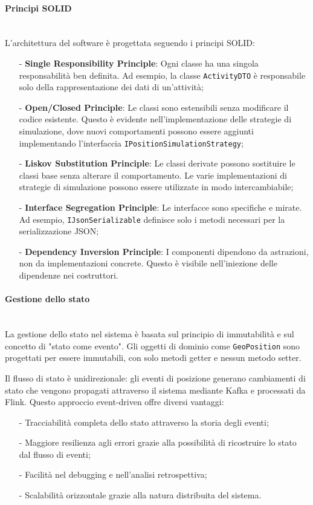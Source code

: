 \documentclass[10pt]{article}
\newcommand{\myparagraph}[1]{\paragraph{#1}\mbox{}\\}
\begin{document}
    \myparagraph{Principi SOLID}
    L'architettura del software è progettata seguendo i principi SOLID:
    \begin{itemize}
        \item[-] \textbf{Single Responsibility Principle}: Ogni classe ha una singola responsabilità ben definita. Ad esempio, la classe \texttt{ActivityDTO} è responsabile solo della rappresentazione dei dati di un'attività;
        \item[-] \textbf{Open/Closed Principle}: Le classi sono estensibili senza modificare il codice esistente. Questo è evidente nell'implementazione delle strategie di simulazione, dove nuovi comportamenti possono essere aggiunti implementando l'interfaccia \texttt{IPositionSimulationStrategy};
        \item[-] \textbf{Liskov Substitution Principle}: Le classi derivate possono sostituire le classi base senza alterare il comportamento. Le varie implementazioni di strategie di simulazione possono essere utilizzate in modo intercambiabile;
        \item[-] \textbf{Interface Segregation Principle}: Le interfacce sono specifiche e mirate. Ad esempio, \texttt{IJsonSerializable} definisce solo i metodi necessari per la serializzazione JSON;
        \item[-] \textbf{Dependency Inversion Principle}: I componenti dipendono da astrazioni, non da implementazioni concrete. Questo è visibile nell'iniezione delle dipendenze nei costruttori.
    \end{itemize}

    \myparagraph{Gestione dello stato}
    La gestione dello stato nel sistema è basata sul principio di immutabilità e sul concetto di "stato come evento". Gli oggetti di dominio come \texttt{GeoPosition} sono progettati per essere immutabili, con solo metodi getter e nessun metodo setter.

    Il flusso di stato è unidirezionale: gli eventi di posizione generano cambiamenti di stato che vengono propagati attraverso il sistema mediante Kafka e processati da Flink. Questo approccio event-driven offre diversi vantaggi:
    \begin{itemize}
        \item[-] Tracciabilità completa dello stato attraverso la storia degli eventi;
        \item[-] Maggiore resilienza agli errori grazie alla possibilità di ricostruire lo stato dal flusso di eventi;
        \item[-] Facilità nel debugging e nell'analisi retrospettiva;
        \item[-] Scalabilità orizzontale grazie alla natura distribuita del sistema.
    \end{itemize}
\end{document}
